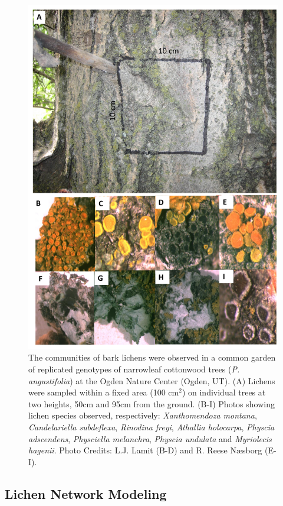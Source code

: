 \documentclass[fleqn,12pt]{olplainarticle}
\begin{document}
\begin{figure}[ht]
\includegraphics[width=0.90\linewidth]{figures/lcn_sampling.png}
\caption{The communities of bark lichens were observed in a common
  garden of replicated genotypes of narrowleaf cottonwood trees
  (\textit{P. angustifolia}) at the Ogden Nature Center (Ogden,
  UT). (A) Lichens were sampled within a fixed area (100 cm$^2$) on
  individual trees at two heights, 50cm and 95cm from the
  ground. (B-I) Photos showing lichen species observed, respectively:
  \textit{Xanthomendoza montana}, \textit{Candelariella subdeflexa},
  \textit{Rinodina freyi}, \textit{Athallia holocarpa},
  \textit{Physcia adscendens}, \textit{Physciella melanchra},
  \textit{Physcia undulata} and \textit{Myriolecis hagenii}. Photo
  Credits: L.J. Lamit (B-D) and R. Reese Næsborg (E-I).}
\label{fig:lichen_sampling}
\end{figure}


\subsection*{Lichen Network Modeling}
\end{document}
